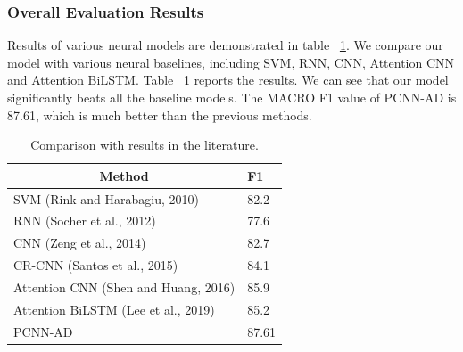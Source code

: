 \documentclass[conference]{IEEEtran}
\begin{document}
\subsubsection*{Overall Evaluation Results}
Results of various neural models are demonstrated in table ~\ref{F1}.
We compare our model with various neural baselines, including SVM, RNN, CNN, Attention CNN and Attention BiLSTM.
Table ~\ref{F1} reports the results.
We can see that our model significantly beats all the baseline models.
The MACRO F1 value of PCNN-AD is 87.61, which is much better than the previous methods.
\begin{table}[h]
\caption{\label{F1} Comparison with results in the literature.}
  \centering
  \begin{tabular}{|l|l|}
  \hline
  \multicolumn{1}{|c|}{Method} & F1   \\ \hline
  SVM (Rink and Harabagiu, 2010) \cite{Rink} & 82.2 \\ \hline
  RNN (Socher et al., 2012) \cite{socher2012semantic} & 77.6 \\ \hline
  CNN (Zeng et al., 2014) \cite{zeng2014relation} & 82.7 \\ \hline
  CR-CNN (Santos et al., 2015) \cite{dos-santos-etal-2015-classifying} & 84.1 \\ \hline
  Attention CNN (Shen and Huang, 2016) \cite{shen-huang-2016-attention} & 85.9 \\ \hline
  Attention BiLSTM (Lee et al., 2019) \cite{DBLP:journals/corr/abs-1901-08163} & 85.2 \\ \hline
  PCNN-AD                      & 87.61 \\ \hline
  \end{tabular}
  
  \end{table}
\end{document}
